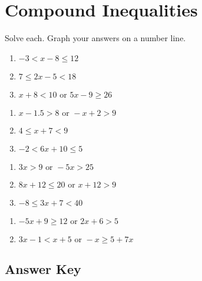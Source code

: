\chapter{Compound Inequalities}

Solve each. Graph your answers on a number line. 

\begin{multicols}{3}
\begin{enumerate}
	\item $-3 < x-8 \leq 12$
	\item $7 \leq 2x - 5 < 18$
	\item $x + 8 < 10 \text{ or } 5x - 9 \geq 26$
\end{enumerate}	\setcounter{Review}{\value{enumi}}
\end{multicols}
\begin{multicols}{3}
\begin{enumerate}	\setcounter{enumi}{\value{Review}}
	\item $x - 1.5 > 8 \text{ or } -x + 2 > 9$
	\item $4 \leq x + 7 < 9$
	\item $-2 < 6x + 10 \leq 5$
\end{enumerate}	\setcounter{Review}{\value{enumi}}
\end{multicols}
\begin{multicols}{3}
\begin{enumerate}	\setcounter{enumi}{\value{Review}}
	\item $3x > 9 \text{ or } -5x > 25$
	\item $8x+12 \leq 20   \text{ or } x + 12 > 9$
	\item $-8 \leq 3x+7 < 40$
\end{enumerate}	\setcounter{Review}{\value{enumi}}
\end{multicols}
\begin{multicols}{3}
\begin{enumerate}	\setcounter{enumi}{\value{Review}}
	\item $-5x + 9 \geq 12 \text{ or } 2x+6 > 5$
	\item $3x - 1 < x + 5 \text{ or } -x \geq 5+7x$
\end{enumerate}	\setcounter{Review}{\value{enumi}}
\end{multicols}



\newpage

\section{Answer Key}

